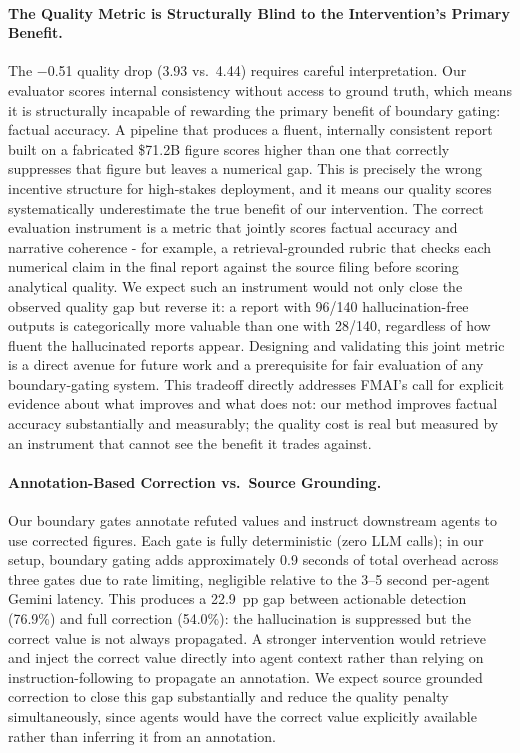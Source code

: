 \documentclass{article}
\theoremstyle{plain}
\theoremstyle{definition}
\theoremstyle{remark}
\begin{document}
\paragraph{The Quality Metric is Structurally Blind to the Intervention's Primary Benefit.} The $-$0.51 quality drop (3.93 vs.\ 4.44) requires careful interpretation. Our evaluator scores internal consistency without access to ground truth, which means it is structurally incapable of rewarding the primary benefit of boundary gating: factual accuracy. A pipeline that produces a fluent, internally consistent report built on a fabricated \$71.2B figure scores higher than one that correctly suppresses that figure but leaves a numerical gap. This is precisely the wrong incentive structure for high-stakes deployment, and it means our quality scores systematically underestimate the true benefit of our intervention. The correct evaluation instrument is a metric that jointly scores factual accuracy and narrative coherence - for example, a retrieval-grounded rubric that checks each numerical claim in the final report against the source filing before scoring analytical quality. We expect such an instrument would not only close the observed quality gap but reverse it: a report with 96/140 hallucination-free outputs is categorically more valuable than one with 28/140, regardless of how fluent the hallucinated reports appear. Designing and validating this joint metric is a direct avenue for future work and a prerequisite for fair evaluation of any boundary-gating system. This tradeoff directly addresses FMAI's call for explicit evidence about what improves and what does not: our method improves factual accuracy substantially and measurably; the quality cost is real but measured by an instrument that cannot see the benefit it trades against.

\paragraph{Annotation-Based Correction vs.\ Source Grounding.} Our boundary gates annotate refuted values and instruct downstream agents to use corrected figures. Each gate is fully deterministic (zero LLM calls); in our setup, boundary gating adds approximately 0.9 seconds of total overhead across three gates due to rate limiting, negligible relative to the 3--5 second per-agent Gemini latency. This produces a 22.9~pp gap between actionable detection (76.9\%) and full correction (54.0\%): the hallucination is suppressed but the correct value is not always propagated. A stronger intervention would retrieve and inject the correct value directly into agent context rather than relying on instruction-following to propagate an annotation. We expect source grounded correction to close this gap substantially and reduce the quality penalty simultaneously, since agents would have the correct value explicitly available rather than inferring it from an annotation.
\end{document}
